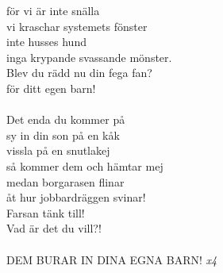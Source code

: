 för vi är inte snälla\\
vi kraschar systemets fönster\\
inte husses hund\\
inga krypande svassande mönster.\\
Blev du rädd nu din fega fan?\\
för ditt egen barn!\\
\\
Det enda du kommer på\\
sy in din son på en kåk\\
vissla på en snutlakej\\
så kommer dem och hämtar mej\\
medan borgarasen flinar\\
åt hur jobbardräggen svinar!\\
Farsan tänk till!\\
Vad är det du vill?!\\
\\
DEM BURAR IN DINA EGNA BARN! \textit{x4}
